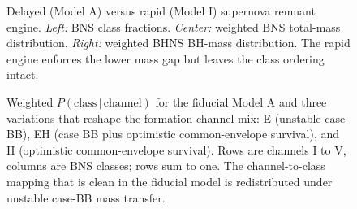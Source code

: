\documentclass[twocolumn,amsmath]{aastex702}
\begin{document}
\begin{figure}[tbp]
\caption{Delayed (Model A) versus rapid (Model I) supernova remnant engine.
\textit{Left:} BNS class fractions. \textit{Center:}
weighted BNS total-mass distribution. \textit{Right:} weighted BHNS BH-mass
distribution. The rapid engine enforces the lower mass gap but leaves the class
ordering intact. \label{fig:snengine}}
\end{figure}

\begin{figure}[tbp]
\caption{Weighted $P(\mathrm{class}\,|\,\mathrm{channel})$ for the fiducial Model
A and three variations that reshape the formation-channel mix: E (unstable case
BB), EH (case BB plus optimistic common-envelope survival), and H (optimistic
common-envelope survival). Rows are \citet{broekgaarden2021} channels I to V,
columns are \citet{gottlieb2024} BNS classes; rows sum to one. The
channel-to-class mapping that is clean in the fiducial model is redistributed
under unstable case-BB mass transfer. \label{fig:chanclass}}
\end{figure}

\clearpage



\end{document}
